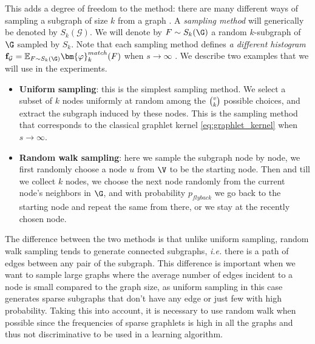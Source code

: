 This adds a degree of freedom to the method: there are many different ways of sampling a subgraph of size $k$ from a graph \citep{graph_sampling}. A \emph{sampling method} will generically be denoted by $S_k(\mathcal{G})$. We will denote by $F \sim S_k(\G)$ a random $k$-subgraph of $\G$ sampled by $S_k$. Note that each sampling method defines \emph{a different histogram} $\mathbf{f}_\mathcal{G} = \mathbb{E}_{F \sim S_k(\G)} \bm{\varphi}^{match}_k(F)$  when $s \to \infty$ . We describe two examples that we will use in the experiments.
\begin{itemize}
\item \textbf{Uniform sampling}: this is the simplest sampling method. We select a subset of $k$ nodes uniformly at random among the $\tbinom{v}{k}$ possible choices, and extract the subgraph induced by these nodes. This is the sampling method that corresponds to the classical graphlet kernel \eqref{eq:graphlet_kernel} when $s \to \infty$.
\item \textbf{Random walk sampling}: here we sample the subgraph node by node, we first randomly choose a node $u$ from $\V$ to be the starting node. Then and till we collect $k$ nodes, we choose the next node randomly from the current node's neighbors in $\G$, and with probability $p_{flyback}$ we go back to the starting node and repeat the same from there, or we stay at the recently chosen node.
\end{itemize}
The difference between the two methods is that unlike uniform sampling, random walk sampling tends  to generate connected subgraphs, \emph{i.e.} there is a path of edges between any pair of the subgraph. This difference is important when we want to sample large graphs where the average number of edges incident to a node is small compared to the graph size, as uniform sampling in this case generates sparse subgraphs that don't have any edge or just few with high probability. Taking this into account, it is necessary to use random walk when possible since the frequencies of sparse graphlets is high in all the graphs and thus not discriminative to be used in a learning algorithm.

